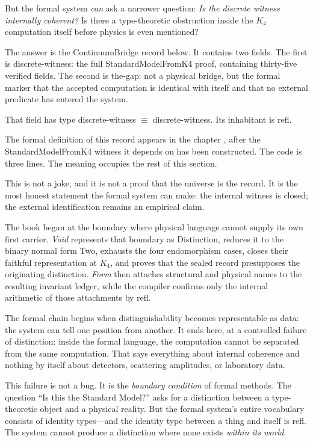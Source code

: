 \documentclass[11pt,a4paper]{book}
\def\texttt#1{#1}%
\begin{document}
But the formal system \emph{can} ask a narrower question: \emph{Is the discrete witness internally coherent?} Is there a type-theoretic obstruction inside the $K_4$ computation itself before physics is even mentioned?

The answer is the \texttt{ContinuumBridge} record below. It contains two fields. The first is \texttt{discrete-witness}: the full \texttt{StandardModelFromK4} proof, containing thirty-five verified fields. The second is \texttt{the-gap}: not a physical bridge, but the formal marker that the accepted computation is identical with itself and that no external predicate has entered the system.

That field has type \texttt{discrete-witness $\equiv$ discrete-witness}. Its inhabitant is \texttt{refl}.

The formal definition of this record appears in the chapter \emph{}, after the \texttt{StandardModelFromK4} witness it depends on has been constructed. The code is three lines. The meaning occupies the rest of this section.

This is not a joke, and it is not a proof that the universe is the record. It is the most honest statement the formal system can make: the internal witness is closed; the external identification remains an empirical claim.

The book began at the boundary where physical language cannot supply its own first carrier. \textit{Void} represents that boundary as \texttt{Distinction}, reduces it to the binary normal form \texttt{Two}, exhausts the four endomorphism cases, closes their faithful representation at $K_4$, and proves that the sealed record presupposes the originating distinction. \textit{Form} then attaches structural and physical names to the resulting invariant ledger, while the compiler confirms only the internal arithmetic of those attachments by \texttt{refl}.

The formal chain begins when distinguishability becomes representable as data: the system can tell one position from another. It ends here, at a controlled failure of distinction: inside the formal language, the computation cannot be separated from the same computation. That says everything about internal coherence and nothing by itself about detectors, scattering amplitudes, or laboratory data.

This failure is not a bug. It is the \emph{boundary condition} of formal methods. The question ``Is this the Standard Model?'' asks for a distinction between a type-theoretic object and a physical reality. But the formal system's entire vocabulary consists of identity types---and the identity type between a thing and itself is \texttt{refl}. The system cannot produce a distinction where none exists \emph{within its world}.
\end{document}
